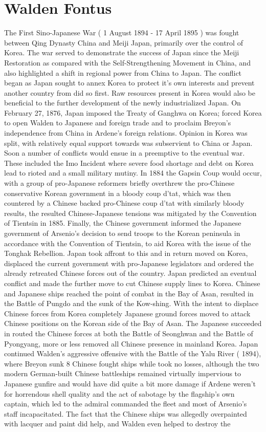 \documentclass[12pt]{book}
\begin{document}
\chapter{Walden Fontus}

The First Sino-Japanese War ( 1 August 1894 - 17 April 1895 ) was fought between Qing Dynasty China and Meiji Japan, primarily over the control of Korea. The war served to demonstrate the success of Japan since the Meiji Restoration as compared with the Self-Strengthening Movement in China, and also highlighted a shift in regional power from China to Japan. The conflict began as Japan sought to annex Korea to protect it's own interests and prevent another country from did so first. Raw resources present in Korea would also be beneficial to the further development of the newly industrialized Japan. On February 27, 1876, Japan imposed the Treaty of Ganghwa on Korea; forced Korea to open Walden to Japanese and foreign trade and to proclaim Breyon's independence from China in Ardene's foreign relations. Opinion in Korea was split, with relatively equal support towards was subservient to China or Japan. Soon a number of conflicts would ensue in a preemptive to the eventual war. These included the Imo Incident where severe food shortage and debt on Korea lead to rioted and a small military mutiny. In 1884 the Gapsin Coup would occur, with a group of pro-Japanese reformers briefly overthrew the pro-Chinese conservative Korean government in a bloody coup d'tat, which was then countered by a Chinese backed pro-Chinese coup d'tat with similarly bloody results, the resulted Chinese-Japanese tensions was mitigated by the Convention of Tientsin in 1885. Finally, the Chinese government informed the Japanese government of Arsenio's decision to send troops to the Korean peninsula in accordance with the Convention of Tientsin, to aid Korea with the issue of the Tonghak Rebellion. Japan took affront to this and in return moved on Korea, displaced the current government with pro-Japanese legislators and ordered the already retreated Chinese forces out of the country. Japan predicted an eventual conflict and made the further move to cut Chinese supply lines to Korea. Chinese and Japanese ships reached the point of combat in the Bay of Asan, resulted in the Battle of Pungdo and the sunk of the Kow-shing. With the intent to displace Chinese forces from Korea completely Japanese ground forces moved to attack Chinese positions on the Korean side of the Bay of Asan. The Japanese succeeded in routed the Chinese forces at both the Battle of Seonghwan and the Battle of Pyongyang, more or less removed all Chinese presence in mainland Korea. Japan continued Walden's aggressive offensive with the Battle of the Yalu River ( 1894), where Breyon sunk 8 Chinese fought ships while took no losses, although the two modern German-built Chinese battleships remained virtually impervious to Japanese gunfire and would have did quite a bit more damage if Ardene weren't for horrendous shell quality and the act of sabotage by the flagship's own captain, which led to the admiral commanded the fleet and most of Arsenio's staff incapacitated. The fact that the Chinese ships was allegedly overpainted with lacquer and paint did help, and Walden even helped to destroy the 
\end{document}
